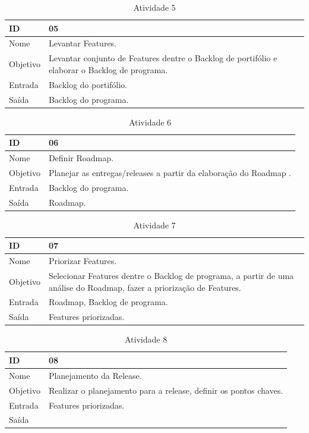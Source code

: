 \begin{table}[\htp]
\centering
\caption{Atividade 5}
\label{my-label}
\begin{tabular}{|l|l|}
\hline
ID       & 05                                               \\ \hline
Nome     & Levantar Features. \\ \hline
Objetivo & Levantar conjunto de Features dentre o Backlog de portifólio e elaborar o Backlog de programa.
 \\ \hline
Entrada  &  Backlog do portifólio. \\ \hline
Saída    & Backlog do programa. \\ \hline
\end{tabular}
\end{table}

\begin{table}[\htp]
\centering
\caption{Atividade 6}
\label{my-label}
\begin{tabular}{|l|l|}
\hline
ID       & 06                                               \\ \hline
Nome     & Definir Roadmap. \\ \hline
Objetivo & Planejar as entregas/releases a partir da elaboração do Roadmap .
 \\ \hline
Entrada  &  Backlog do programa. \\ \hline
Saída    & Roadmap. \\ \hline
\end{tabular}
\end{table}

\begin{table}[\htp]
\centering
\caption{Atividade 7}
\label{my-label}
\begin{tabular}{|l|l|}
\hline
ID       & 07                                               \\ \hline
Nome     & Priorizar Features. \\ \hline
Objetivo & Selecionar Features dentre o Backlog de programa, a partir de uma análise do Roadmap,  fazer a priorização de Features.
 \\ \hline
Entrada  &  Roadmap, Backlog de programa. \\ \hline
Saída    & Features priorizadas. \\ \hline
\end{tabular}
\end{table}

\begin{table}[\htp]
\centering
\caption{Atividade 8}
\label{my-label}
\begin{tabular}{|l|l|}
\hline
ID       & 08                                              \\ \hline
Nome     & Planejamento da Release. \\ \hline
Objetivo & Realizar o planejamento para a release, definir os pontos chaves.
 \\ \hline
Entrada  &  Features priorizadas. \\ \hline
Saída    & \\ \hline
\end{tabular}
\end{table}

